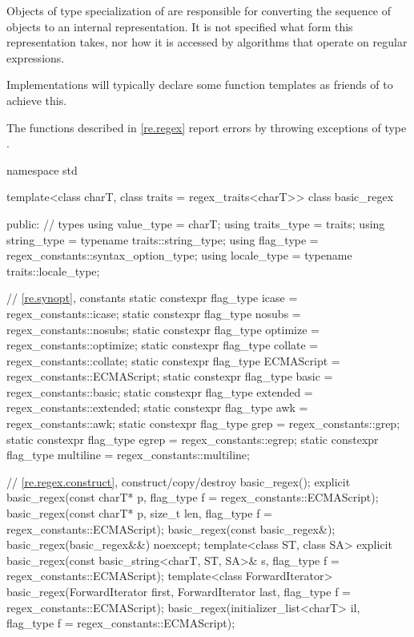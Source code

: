 \pnum
Objects of type specialization of  are responsible for
converting the sequence of  objects to an internal
representation. It is not specified what form this representation
takes, nor how it is accessed by algorithms that operate on regular
expressions.
\begin{note}
Implementations will typically declare
some function templates as friends of  to achieve
this.
\end{note}

\pnum
{}%
The functions described in \ref{re.regex} report errors by throwing
exceptions of type .

%
\begin{codeblock}
namespace std {
  template<class charT, class traits = regex_traits<charT>>
    class basic_regex {
    public:
      // types
      using value_type  =          charT;
      using traits_type =          traits;
      using string_type = typename traits::string_type;
      using flag_type   =          regex_constants::syntax_option_type;
      using locale_type = typename traits::locale_type;

      // \ref{re.synopt}, constants
      static constexpr flag_type icase = regex_constants::icase;
      static constexpr flag_type nosubs = regex_constants::nosubs;
      static constexpr flag_type optimize = regex_constants::optimize;
      static constexpr flag_type collate = regex_constants::collate;
      static constexpr flag_type ECMAScript = regex_constants::ECMAScript;
      static constexpr flag_type basic = regex_constants::basic;
      static constexpr flag_type extended = regex_constants::extended;
      static constexpr flag_type awk = regex_constants::awk;
      static constexpr flag_type grep = regex_constants::grep;
      static constexpr flag_type egrep = regex_constants::egrep;
      static constexpr flag_type multiline = regex_constants::multiline;

      // \ref{re.regex.construct}, construct/copy/destroy
      basic_regex();
      explicit basic_regex(const charT* p, flag_type f = regex_constants::ECMAScript);
      basic_regex(const charT* p, size_t len, flag_type f = regex_constants::ECMAScript);
      basic_regex(const basic_regex&);
      basic_regex(basic_regex&&) noexcept;
      template<class ST, class SA>
        explicit basic_regex(const basic_string<charT, ST, SA>& s,
                             flag_type f = regex_constants::ECMAScript);
      template<class ForwardIterator>
        basic_regex(ForwardIterator first, ForwardIterator last,
                    flag_type f = regex_constants::ECMAScript);
      basic_regex(initializer_list<charT> il, flag_type f = regex_constants::ECMAScript);

}}
\end{codeblock}
